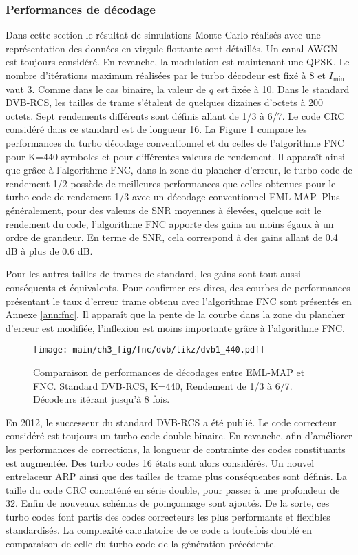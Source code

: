 \subsubsection{Performances de décodage}
Dans cette section le résultat de simulations Monte Carlo réalisés avec une représentation des données en virgule
flottante sont détaillés. Un canal AWGN est toujours considéré. En revanche, la modulation est maintenant une QPSK. Le 
nombre d'itérations maximum réalisées par le turbo décodeur est fixé à 8 et $I_{\text{min}}$ vaut 3.
Comme dans le cas binaire, la valeur de $q$ est fixée à 10. Dans le standard DVB-RCS, les tailles de trame s'étalent 
de quelques dizaines d'octets à 200 octets. Sept rendements différents sont définis allant de 1/3 à 6/7. Le code CRC 
considéré dans ce standard est de longueur 16. La Figure \ref{fig:fnc_dvb1_440} compare les performances du turbo décodage
conventionnel et du celles de l'algorithme FNC pour K=440 symboles et pour différentes valeurs de rendement. Il apparaît 
ainsi que grâce à l'algorithme FNC, dans la zone du plancher d'erreur, le turbo code de rendement 1/2 possède de 
meilleures performances que celles obtenues pour le turbo code de rendement 1/3 avec un décodage conventionnel EML-MAP. 
Plus généralement, pour des valeurs de SNR moyennes à élevées, quelque soit le rendement du code, l'algorithme FNC apporte 
des gains au moins égaux à un ordre de grandeur. En terme de SNR, cela correspond à des gains allant de 0.4 dB à plus de 
0.6 dB.

Pour les autres tailles de trames de standard, les gains sont tout aussi conséquents et équivalents. Pour confirmer ces
dires, des courbes de performances présentant le taux d'erreur trame obtenu avec l'algorithme FNC sont présentés en 
Annexe \ref{ann:fnc}. Il apparaît que la pente de la courbe dans la zone du plancher d'erreur est modifiée, l'inflexion
est moins importante grâce à l'algorithme FNC.

\begin{figure}[!htb]
	\centering
	\texttt{[image: main/ch3\_fig/fnc/dvb/tikz/dvb1\_440.pdf]}
	\caption{Comparaison de performances de décodages entre EML-MAP et FNC. Standard DVB-RCS, K=440, Rendement de 1/3 à 
	6/7. Décodeurs itérant jusqu'à 8 fois. \label{fig:fnc_dvb1_440}}
\end{figure}
En 2012, le successeur du standard DVB-RCS a été publié. Le code correcteur considéré est toujours un turbo code double
binaire. En revanche, afin d'améliorer les performances de corrections, la longueur de contrainte des codes constituants
est augmentée. Des turbo codes 16 états sont alors considérés. Un nouvel entrelaceur ARP ainsi que des tailles de trame
plus conséquentes sont définis. La taille du code CRC concaténé en série double, pour passer à une profondeur de 32. 
Enfin de nouveaux schémas de poinçonnage sont ajoutés. De la sorte, ces turbo codes font 
partis des codes correcteurs les plus performants et flexibles standardisés. La complexité calculatoire de ce code a
toutefois doublé en comparaison de celle du turbo code de la génération précédente. 


